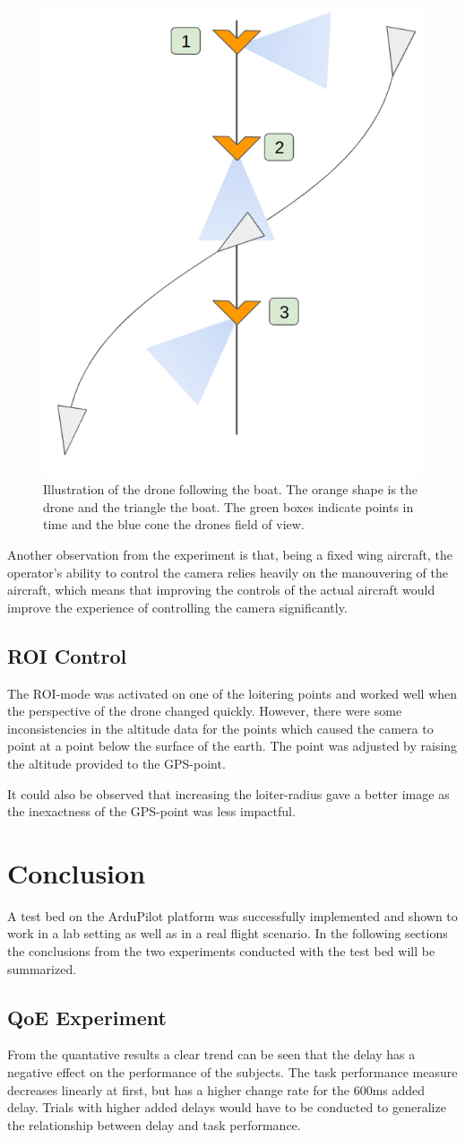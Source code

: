 \documentclass[nofilelist]{cslthse-msc}
\begin{document}
\begin{figure}[htp]
   \centering
   \includegraphics[width=.33\textwidth]{images/drone-boat-illustration.png}
   \caption{Illustration of the drone following the boat. The orange shape is the drone and the triangle the boat. The green boxes indicate points in time and the blue cone the drones field of view.}
   \label{fig:boat-follow}
\end{figure}

Another observation from the experiment is that, being a fixed wing aircraft, the operator's ability to control the camera relies heavily on the manouvering of the aircraft, which means that improving the controls of the actual aircraft would improve the experience of controlling the camera significantly. 

\section{ROI Control}
The ROI-mode was activated on one of the loitering points and worked well when the perspective of the drone changed quickly. However, there were some inconsistencies in the altitude data for the points which caused the camera to point at a point below the surface of the earth. The point was adjusted by raising the altitude provided to the GPS-point. 

It could also be observed that increasing the loiter-radius gave a better image as the inexactness of the GPS-point was less impactful.

\chapter{Conclusion}
A test bed on the ArduPilot platform was successfully implemented and shown to work in a lab setting as well as in a real flight scenario. In the following sections the conclusions from the two experiments conducted with the test bed will be summarized.

\section{QoE Experiment}
From the quantative results a clear trend can be seen that the delay has a negative effect on the performance of the subjects. The task performance measure decreases linearly at first, but has a higher change rate for the 600ms added delay. Trials with higher added delays would have to be conducted to generalize the relationship between delay and task performance.
\end{document}
